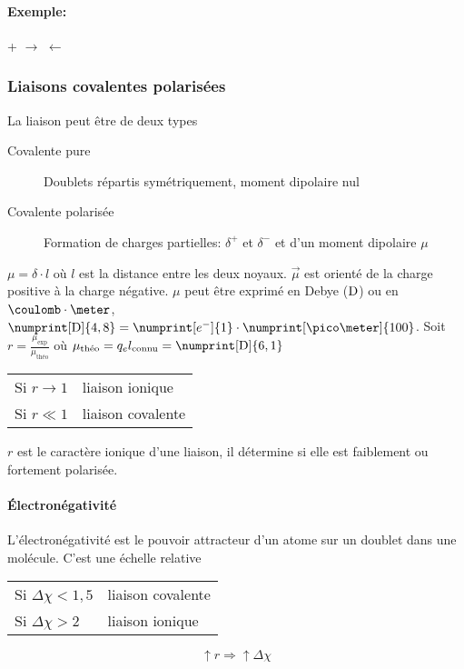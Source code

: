 \paragraph{Exemple:}
\begin{center}
  \hspace{0.3cm} + \hspace{0.3cm}$\longrightarrow$ $\leftarrow$
\end{center}
\subsubsection{Liaisons covalentes polarisées}
La liaison peut être de deux types
\begin{description}
  \item[Covalente pure] Doublets répartis symétriquement,
    moment dipolaire nul
  \item[Covalente polarisée] Formation de charges partielles:
    $\delta^+$ et $\delta^-$ et d'un moment dipolaire $\mu$
\end{description}
$\mu = \delta \cdot l$ où $l$ est la distance entre les deux noyaux.
$\vec{\mu}$ est orienté de la charge positive à la charge négative.
$\mu$ peut être exprimé en Debye ($\mathrm{D}$) ou en $\coulomb\cdot\meter$,
$\numprint[\debye]{4,8} = \numprint[e^-]{1} \cdot \numprint[\pico\meter]{100}$.
Soit $r = \frac{\mu_{\mathrm{exp}}}{\mu_{\textrm{théo}}}$
où $\mu_{\textrm{théo}} = q_e l_{\mathrm{connu}} = \numprint[\debye]{6,1}$
\begin{center}
  \begin{tabular}{ll}
    Si $r \to 1$ & liaison ionique\\
    Si $r \ll 1$ & liaison covalente
  \end{tabular}
\end{center}
$r$ est le caractère ionique d'une liaison,
il détermine si elle est faiblement ou fortement polarisée.

\paragraph{\'Electronégativité}
L'électronégativité est le pouvoir attracteur d'un atome sur un doublet dans une molécule.
C'est une échelle relative
\begin{center}
  \begin{tabular}{ll}
    Si $\Delta \chi < 1,5$ & liaison covalente\\
    Si $\Delta \chi > 2$ & liaison ionique
  \end{tabular}
\end{center}
$$\uparrow r \Rightarrow \uparrow \Delta \chi$$


